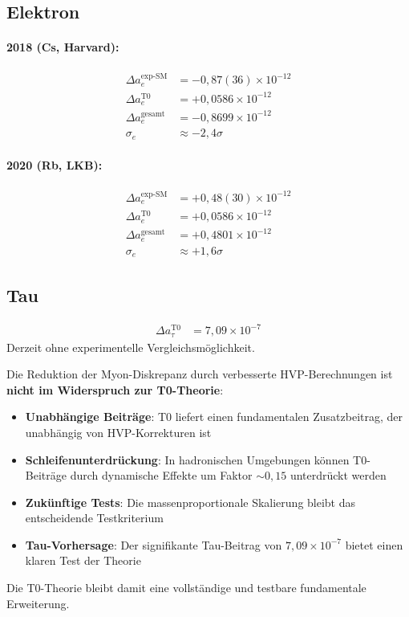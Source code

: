\documentclass[12pt,a4paper]{article}
\theoremstyle{definition}
\begin{document}
	\subsection*{Elektron}
	\paragraph{2018 (Cs, Harvard):}
	\begin{align}
		\Delta a_e^{\text{exp-SM}} &= -0,87(36) \times 10^{-12}\\
		\Delta a_e^{\text{T0}} &= +0,0586 \times 10^{-12}\\
		\Delta a_e^{\text{gesamt}} &= -0,8699 \times 10^{-12}\\
		\sigma_e &\approx -2,4\sigma
	\end{align}
	
	\paragraph{2020 (Rb, LKB):}
	\begin{align}
		\Delta a_e^{\text{exp-SM}} &= +0,48(30) \times 10^{-12}\\
		\Delta a_e^{\text{T0}} &= +0,0586 \times 10^{-12}\\
		\Delta a_e^{\text{gesamt}} &= +0,4801 \times 10^{-12}\\
		\sigma_e &\approx +1,6\sigma
	\end{align}
	
	\subsection*{Tau}
	\begin{align}
		\Delta a_\tau^{\text{T0}} &= 7,09 \times 10^{-7}
	\end{align}
	Derzeit ohne experimentelle Vergleichsmöglichkeit.
	
	\begin{verification}
		Die Reduktion der Myon-Diskrepanz durch verbesserte HVP-Berechnungen ist \textbf{nicht im Widerspruch zur T0-Theorie}:
		
		\begin{itemize}
			\item \textbf{Unabhängige Beiträge}: T0 liefert einen fundamentalen Zusatzbeitrag, der unabhängig von HVP-Korrekturen ist
			\item \textbf{Schleifenunterdrückung}: In hadronischen Umgebungen können T0-Beiträge durch dynamische Effekte um Faktor $\sim0,15$ unterdrückt werden
			\item \textbf{Zukünftige Tests}: Die massenproportionale Skalierung bleibt das entscheidende Testkriterium
			\item \textbf{Tau-Vorhersage}: Der signifikante Tau-Beitrag von $7,09 \times 10^{-7}$ bietet einen klaren Test der Theorie
		\end{itemize}
		
		Die T0-Theorie bleibt damit eine vollständige und testbare fundamentale Erweiterung.
	\end{verification}
	
\end{document}
